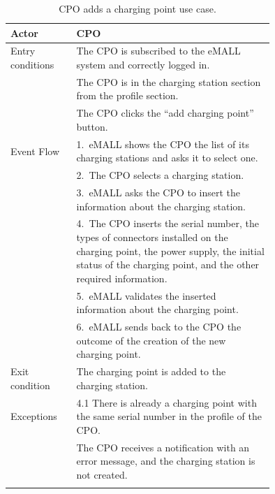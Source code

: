 \begin{center}
    \begin{longtable}{lp{0.75\linewidth}}
        \hline
        Actor            & CPO                                                                                             \\
        \hline
        Entry conditions & The CPO is subscribed to the eMALL system and correctly logged in.                              \\
        & The CPO is in the charging station section from the profile section.                            \\
        & The CPO clicks the “add charging point” button.                                                 \\
        \hline
        Event Flow       & 1.\ eMALL shows the CPO the list of its charging stations and asks it to select one.            \\
        & 2.\ The CPO selects a charging station.                                                         \\
        & 3.\ eMALL asks the CPO to insert the information about the charging station.                    \\
        & 4.\ The CPO inserts the serial number, the types of connectors installed on the charging point, the power supply,
        the initial status of the charging point, and the other required information. \\
        & 5.\ eMALL validates the inserted information about the charging point.                          \\
        & 6.\ eMALL sends back to the CPO the outcome of the creation of the new charging point.          \\
        \hline
        Exit condition   & The charging point is added to the charging station.                                            \\
        \hline
        Exceptions       & 4.1 There is already a charging point with the same serial number in the profile of the CPO.    \\
        & The CPO receives a notification with an error message, and the charging station is not created. \\
        \hline
        \caption{CPO adds a charging point use case.}
        \label{tab: CPO_adds_charging_point_use_case}
    \end{longtable}
\end{center}

